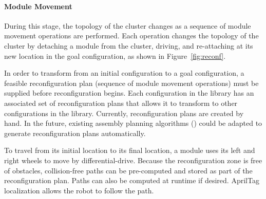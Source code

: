 \documentclass[conference]{IEEEtran}
\begin{document}
\paragraph{Module Movement} During this stage, the topology of the cluster changes as a sequence of module movement operations are performed.  Each operation changes the topology of the cluster by detaching a module from the cluster, driving, and re-attaching at its new location in the goal configuration, as shown in Figure~\ref{fig:reconf}.

In order to transform from an initial configuration to a goal configuration, a feasible reconfiguration plan (sequence of module movement operations) must be supplied before reconfiguration begins.  Each configuration in the library has an associated set of reconfiguration plans that allows it to transform to other configurations in the library.  Currently, reconfiguration plans are created by hand.  In the future, existing assembly planning algorithms (\cite{Werfel2007,Seo2013}) could be adapted to generate reconfiguration plans automatically.


To travel from its initial location to its final location, a module uses its left and right wheels to move by differential-drive.  Because the reconfiguration zone is free of obstacles, collision-free paths can be pre-computed and stored as part of the reconfiguration plan.  Paths can also be computed at runtime if desired.  AprilTag localization allows the robot to follow the path.
\end{document}
